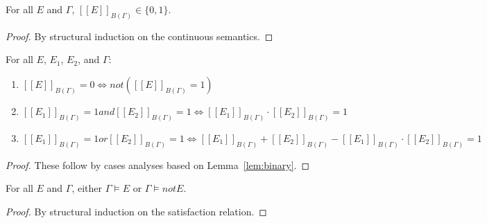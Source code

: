 \documentclass[acmsmall, review, anonymous]{acmart}\settopmatter{printfolios=true,printccs=false,printacmref=false}
\newcommand{\qqpi}[2]{[\![#2]\!]_{#1}}
\begin{document}
\begin{lemma} \label{lem:binary}
    For all $E$ and $\Gamma$, $\qqpi{B(\Gamma)}{E} \in \{0,1\}$.
\end{lemma}

\begin{proof} %
    By structural induction on the continuous semantics.
\end{proof}


\begin{lemma}
For all $E$, $E_1$, $E_2$, and $\Gamma$:
\begin{enumerate}
    \item $\qqpi{B(\Gamma)}{E} = 0 \Leftrightarrow{} not (\qqpi{B(\Gamma)}{E} = 1)$
    \item $\qqpi{B(\Gamma)}{E_1} = 1 \mathrel{and} \qqpi{B(\Gamma)}{E_2} = 1 \Leftrightarrow{}  \qqpi{B(\Gamma)}{E_1} \cdot \qqpi{B(\Gamma)}{E_2} = 1$
    \item $\qqpi{B(\Gamma)}{E_1} = 1 \mathrel{or} \qqpi{B(\Gamma)}{E_2} = 1 \Leftrightarrow{}  \qqpi{B(\Gamma)}{E_1} + \qqpi{B(\Gamma)}{E_2} - \qqpi{B(\Gamma)}{E_1} \cdot \qqpi{B(\Gamma)}{E_2} = 1$
\end{enumerate}
\end{lemma}
\begin{proof}
  These follow by cases analyses based on Lemma~\ref{lem:binary}.
\end{proof}


\begin{lemma} \label{lem:models}
    For all $E$ and $\Gamma$, either $\Gamma \models E$ or $\Gamma \models{} \mathrel{not} E$.
\end{lemma}

\begin{proof}
    By structural induction on the satisfaction relation.
\end{proof}


\end{document}
